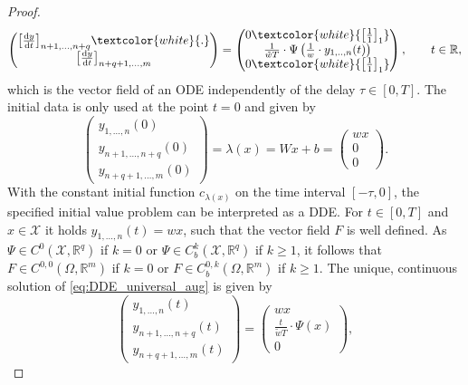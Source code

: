 \documentclass[10pt]{article}
\numberwithin{equation}{section}
\newcommand*{\dd}{\mathrm{d}}
\begin{document}
\begin{proof}
\begin{equation}
\begin{pmatrix}
				\big[\frac{\dd y}{\dd t}	\big]_{n+1,\ldots,n+q}\textcolor{white}{.} \\
				\big[\frac{\dd y}{\dd t}\big]_{n+q+1,\ldots,m}
			\end{pmatrix}
			= 
			\begin{pmatrix}
				0 \textcolor{white}{\big[\frac{1}{1}\big]_1}\\
				\frac{1}{\tilde w T} \cdot \Psi\left(\frac{1}{w}\cdot y_{1,..,n}(t)\right)\\
				0 \textcolor{white}{\big[\frac{1}{1}\big]_1}
			\end{pmatrix}, \qquad t\in\mathbb{R},
		\end{equation}
		which is the vector field of an ODE independently of the delay $\tau\in[0,T]$. The initial data is only used at the point $t = 0$ and given by
		\begin{equation*}
			\begin{pmatrix}
				y_{1,\ldots,n}(0) \\
				y_{n+1,\ldots,n+q}(0) \\
				y_{n+q+1,\ldots,m}(0)
			\end{pmatrix}
			= \lambda(x) = Wx+b = \begin{pmatrix}
				wx \\ 0 \\ 0
			\end{pmatrix}.
		\end{equation*} 
		With the constant initial function $c_{\lambda(x)}$ on the time interval $[-\tau,0]$, the specified initial value problem can be interpreted as a DDE. For $t\in[0,T]$ and $x\in\mathcal{X}$ it holds $y_{1,\ldots,n}(t) = wx$, such that the vector field $F$ is well defined. As $\Psi\in C^0(\mathcal{X}, \mathbb{R}^q)$ if $k = 0$ or $\Psi\in C^k_b(\mathcal{X},\mathbb{R}^q)$ if $k\geq 1$, it follows that $F \in C^{0,0}(\Omega,\mathbb{R}^m)$ if $k = 0$ or $F\in C_b^{0,k}(\Omega,\mathbb{R}^m)$ if $k\geq 1$. The unique, continuous solution of \eqref{eq:DDE_universal_aug} is given by
		\begin{equation*}
			\begin{pmatrix}
				y_{1,\ldots,n}(t) \\
				y_{n+1,\ldots,n+q}(t) \\
				y_{n+q+1,\ldots,m}(t)
			\end{pmatrix}
			=  \begin{pmatrix}
				wx \\ \frac{t}{\tilde w T} \cdot \Psi(x) \\ 0
			\end{pmatrix},

\end{equation*}
\end{proof}
\end{document}
